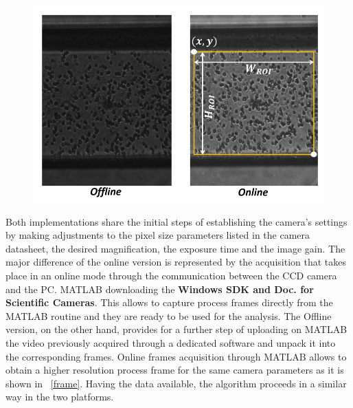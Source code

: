 \documentclass[journal]{IEEEtran}
\theoremstyle{definition}
\theoremstyle{remark}
\begin{document}
\begin{figure}[t]
	\centering
	\includegraphics[width=1\columnwidth]{images/frames}
\end{figure}

Both implementations share the initial steps of establishing the camera's settings by making adjustments to the pixel size parameters listed in the camera datasheet, the desired magnification, the exposure time and the image gain. 
The major difference of the online version is represented by the acquisition that takes place in an online mode through the communication between the CCD camera and the PC.  MATLAB downloading the \textbf{Windows SDK and Doc. for Scientific Cameras}. This allows to capture process frames directly from the MATLAB routine and they are ready to be used for the analysis. The Offline version, on the other hand, provides for a further step of uploading on MATLAB the video previously acquired through a dedicated software and unpack it into the corresponding frames. 
Online frames acquisition through MATLAB allows to obtain a higher resolution process frame for the same camera parameters as it is shown in ~\fig\ref{frame}.
Having the data available, the algorithm proceeds in a similar way in the two platforms.
\newcommand{\abscissa}{x}
\newcommand{\ordinate}{y}
\newcommand{\mean}[1]{<V_{#1}(t)>}
\newcommand{\spatialmean}[3]{V_{#1}({#2},{#3},t)}
\end{document}
